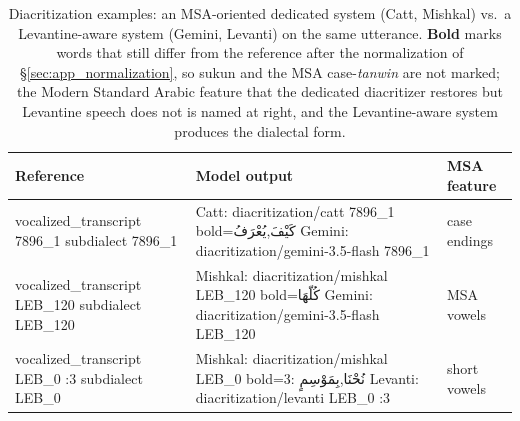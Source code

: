 \begin{table}[t]
\centering
\small
\begin{tabular}{p{2.2cm} p{3.1cm} p{1.4cm}}
\toprule
 \textbf{Reference} & \textbf{Model output} & \textbf{MSA feature}\\
\midrule
  {{vocalized_transcript 7896_1}}
    \newline \scriptsize {{subdialect 7896_1}}
  & Catt: {{diacritization/catt 7896_1 bold=كَيْفَ,يُعْرَفُ}}
    \newline Gemini: {{diacritization/gemini-3.5-flash 7896_1}}
    & case endings \\
  {{vocalized_transcript LEB_120}}
    \newline \scriptsize {{subdialect LEB_120}}
  & Mishkal: {{diacritization/mishkal LEB_120 bold=كُلّهَا}}
    \newline Gemini: {{diacritization/gemini-3.5-flash LEB_120}}
    & MSA vowels \\
  {{vocalized_transcript LEB_0 :3}}
    \newline \scriptsize {{subdialect LEB_0}}
  & Mishkal: {{diacritization/mishkal LEB_0 bold=نُحْنَا,بِمَوْسِمٍ :3}}
    \newline Levanti: {{diacritization/levanti LEB_0 :3}}
    & short vowels \\
    \bottomrule
\end{tabular}
\caption{Diacritization examples: an MSA-oriented dedicated system (Catt,
Mishkal) vs.\ a Levantine-aware system (Gemini, Levanti) on the same utterance.
\textbf{Bold} marks words that still differ from the reference after the
normalization of \S\ref{sec:app_normalization}, so sukun and the MSA
case-\textit{tanwin} are not marked; the Modern Standard Arabic feature that
the dedicated diacritizer restores but Levantine speech does not is named at
right, and the Levantine-aware system produces the dialectal form.}
\label{tab:diac-qualitative}
\end{table}
